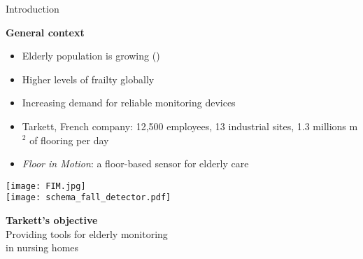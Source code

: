 \begin{frame}{Introduction}
\begin{minipage}[t]{0.48\linewidth}
    \vspace{0pt}
        \centering\textbf{General context}
        \begin{itemize}
            \item Elderly population is growing (\citet{WorldHealthOrganization2007})
            \item Higher levels of frailty globally
            \item Increasing demand for reliable monitoring devices
            \item Tarkett, French company: 12,500 employees, 13 industrial sites, 1.3 millions m$^2$ of flooring per day
            \item \emph{Floor in Motion}: a floor-based sensor for elderly care
        \end{itemize}
            \smallskip
            \texttt{[image: FIM.jpg]}\\[2pt]
            \texttt{[image: schema\_fall\_detector.pdf]}\\
    \pause
\end{minipage}\hfill
\begin{minipage}[t]{0.47\linewidth}
        \vspace{0pt}
        \centering\textbf{Tarkett's objective}\\
        \smallskip
        {\textcolor{myblue}{Providing tools for elderly monitoring\\ in nursing homes}}
    

\end{minipage}
\end{frame}
